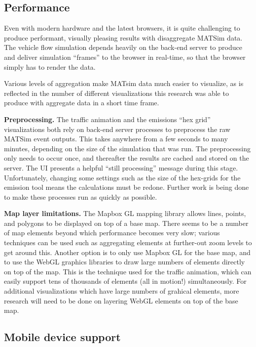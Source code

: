 \hypertarget{performance}{%
\subsection{Performance}\label{performance}}

Even with modern hardware and the latest browsers, it is quite
challenging to produce performant, visually pleasing results with
disaggregate MATSim data. The vehicle flow simulation depends heavily on
the back-end server to produce and deliver simulation ``frames'' to the
browser in real-time, so that the browser simply has to render the data.

Various levels of aggregation make MATsim data much easier to visualize,
as is reflected in the number of different visualizations this research
was able to produce with aggregate data in a short time frame.

\textbf{Preprocessing.} The traffic animation and the emissions ``hex
grid'' visualizations both rely on back-end server processes to
preprocess the raw MATSim event outputs. This takes anywhere from a few
seconds to many minutes, depending on the size of the simulation that
was run. The preprocessing only needs to occur once, and thereafter the
results are cached and stored on the server. The UI presents a helpful
``still processing'' message during this stage. Unfortunately, changing
some settings such as the size of the hex-grids for the emission tool
means the calculations must be redone. Further work is being done to
make these processes run as quickly as possible.

\textbf{Map layer limitations.} The Mapbox GL mapping library allows
lines, points, and polygons to be displayed on top of a base map. There
seems to be a number of map elements beyond which performance becomes
very slow; various techniques can be used such as aggregating elements
at further-out zoom levels to get around this. Another option is to only
use Mapbox GL for the base map, and to use the WebGL graphics libraries
to draw large numbers of elements directly on top of the map. This is
the technique used for the traffic animation, which can easily support
tens of thousands of elements (all in motion!) simultaneously. For
additional visualizations which have large numbers of grahical elements,
more research will need to be done on layering WebGL elements on top of
the base map.

\hypertarget{mobile-device-support}{%
\subsection{Mobile device support}\label{mobile-device-support}}


